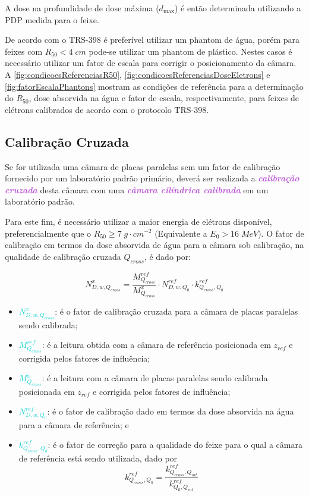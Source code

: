 \documentclass[11pt,a4paper]{article}
\newcounter{exemplo}
\begin{document}
	A dose na profundidade de dose máxima ($d_{\text{max}}$) é então determinada utilizando a PDP medida para o feixe.

	De acordo com o TRS-398 é preferível utilizar um phantom de água, porém para feixes com $R_{50} < 4 \; cm$ pode-se utilizar um phantom de plástico. Nestes casos é necessário utilizar um fator de escala para corrigir o posicionamento da câmara.  A \ref{fig:condicoesReferenciasR50}, \ref{fig:condicoesReferenciasDoseEletrons} e \ref{fig:fatorEscalaPhantons} mostram as condições de referência para a determinação do $R_{50}$, dose absorvida na água e fator de escala, respectivamente, para feixes de elétrons calibrados de acordo com o protocolo TRS-398.
	
	\subsection*{Calibração Cruzada}
	
	Se for utilizada uma câmara de placas paralelas sem um fator de calibração fornecido por um laboratório padrão primário, deverá ser realizada a \textcolor{MediumOrchid}{\textbf{\textit{calibração cruzada}}} desta câmara com uma \textcolor{MediumOrchid}{\textbf{\textit{câmara cilíndrica calibrada}}} em um laboratório padrão.

	Para este fim, é necessário utilizar a maior energia de elétrons disponível, preferencialmente que o  $R_{50} \geq 7\; g\cdot cm^{-2}$ (Equivalente a $E_0 > 16 \; MeV$). O fator de calibração em termos da dose absorvida de água para a câmara sob calibração, na qualidade de calibração cruzada $Q_{cross}$, é dado por:

	$$N_{D,w,Q_{cross}}^{x} = \frac{M_{Q_{cross}}^{ref}}{M_{Q_{cross}}^{x}} \cdot N_{D,w,Q_0}^{ref}\cdot k_{Q_{cross},Q_0}^{ref}$$

	\begin{exemplo}[onde:]
		\begin{itemize}
			\item \textcolor{DarkTurquoise}{$N_{D,w,Q_{cross}}^{x}$}: é o fator de calibração cruzada para a câmara de placas paralelas sendo calibrada;
			\item \textcolor{DarkTurquoise}{$M_{Q_{cross}}^{ref}$}: é a leitura obtida com a câmara de referência posicionada em $z_{ref}$ e corrigida pelos fatores de influência;
			\item \textcolor{DarkTurquoise}{$M_{Q_{cross}}^{x}$}: é a leitura com a câmara de placas paralelas sendo calibrada posicionada em $z_{ref}$ e corrigida pelos fatores de influência;
			\item \textcolor{DarkTurquoise}{$N_{D,w,Q_0}^{ref}$}: é o fator de calibração dado em termos da dose absorvida na água para a câmara de referência; e
			\item \textcolor{DarkTurquoise}{$ k_{Q_{cross},Q_0}^{ref}$}: é o fator de correção para a qualidade do feixe para o qual a câmara de referência está sendo utilizada, dado por $$k_{Q_{cross},Q_0}^{ref} = \frac{k_{Q_{cross},Q_{int}}^{ref}}{k_{Q_0, Q_{int}}^{ref}}$$
		\end{itemize}
	\end{exemplo}
\end{document}
